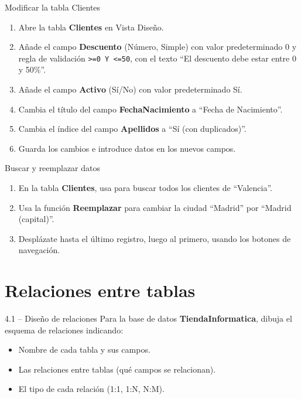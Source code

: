 \documentclass[12pt,a4paper]{article}
\newcommand{\tecla}[1]{\fbox{\small\texttt{#1}}}
\begin{document}
\begin{practica}{Modificar la tabla Clientes}
\begin{enumerate}
  \item Abre la tabla \textbf{Clientes} en Vista Diseño.
  \item Añade el campo \textbf{Descuento} (Número, Simple) con valor predeterminado 0 y regla de validación \texttt{>=0 Y <=50}, con el texto ``El descuento debe estar entre 0 y 50\%''.
  \item Añade el campo \textbf{Activo} (Sí/No) con valor predeterminado Sí.
  \item Cambia el título del campo \textbf{FechaNacimiento} a ``Fecha de Nacimiento''.
  \item Cambia el índice del campo \textbf{Apellidos} a ``Sí (con duplicados)''.
  \item Guarda los cambios e introduce datos en los nuevos campos.
\end{enumerate}
\end{practica}

\begin{practica}{Buscar y reemplazar datos}
\begin{enumerate}
  \item En la tabla \textbf{Clientes}, usa \tecla{Ctrl+B} para buscar todos los clientes de ``Valencia''.
  \item Usa la función \textbf{Reemplazar} para cambiar la ciudad ``Madrid'' por ``Madrid (capital)''.
  \item Desplázate hasta el último registro, luego al primero, usando los botones de navegación.
\end{enumerate}
\end{practica}

\section{Relaciones entre tablas}

\begin{ejercicio}{4.1 -- Diseño de relaciones}
Para la base de datos \textbf{TiendaInformatica}, dibuja el esquema de relaciones indicando:
\begin{itemize}
  \item Nombre de cada tabla y sus campos.
  \item Las relaciones entre tablas (qué campos se relacionan).
  \item El tipo de cada relación (1:1, 1:N, N:M).
\end{itemize}
\end{ejercicio}
\end{document}
